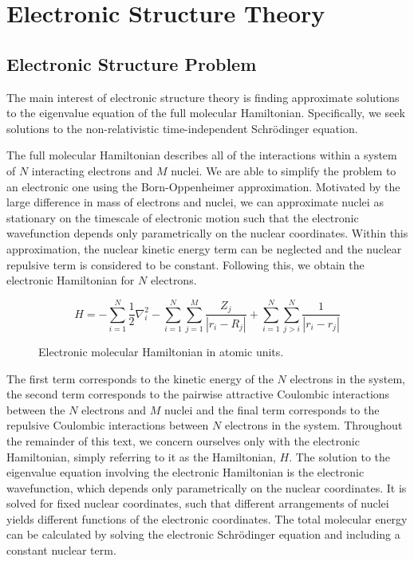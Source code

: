 \section{\label{electronic-structure-theory}Electronic Structure Theory}

\subsection{Electronic Structure Problem}

The main interest of electronic structure theory is finding approximate solutions to the eigenvalue equation of the full molecular Hamiltonian. Specifically, we seek solutions to the non-relativistic time-independent Schrödinger equation.

The full molecular Hamiltonian describes all of the interactions within a system of $N$ interacting electrons and $M$ nuclei. We are able to simplify the problem to an electronic one using the Born-Oppenheimer approximation. Motivated by the large difference in mass of electrons and nuclei, we can approximate nuclei as stationary on the timescale of electronic motion such that the electronic wavefunction depends only parametrically on the nuclear coordinates. Within this approximation, the nuclear kinetic energy term can be neglected and the nuclear repulsive term is considered to be constant. Following this, we obtain the electronic Hamiltonian for $N$ electrons.

\begin{figure}[H]
\begin{equation*}
    H =
    - \sum_{i=1}^{N} \frac{1}{2} \nabla^{2}_{i}
    - \sum_{i=1}^{N} \sum_{j=1}^{M} \frac{Z_j}{|r_{i} - R_{j}|}
    + \sum_{i=1}^{N} \sum_{j>i}^{N} \frac{1}{|r_{i} - r_{j}|}
\end{equation*}
\caption{Electronic molecular Hamiltonian in atomic units.}
\end{figure}

The first term corresponds to the kinetic energy of the $N$ electrons in the system, the second term corresponds to the pairwise attractive Coulombic interactions between the $N$ electrons and $M$ nuclei and the final term corresponds to the repulsive Coulombic interactions between $N$ electrons in the system. Throughout the remainder of this text, we concern ourselves only with the electronic Hamiltonian, simply referring to it as the Hamiltonian, $H$. The solution to the eigenvalue equation involving the electronic Hamiltonian is the electronic wavefunction, which depends only parametrically on the nuclear coordinates. It is solved for fixed nuclear coordinates, such that different arrangements of nuclei yields different functions of the electronic coordinates. The total molecular energy can be calculated by solving the electronic Schrödinger equation and including a constant nuclear term.

